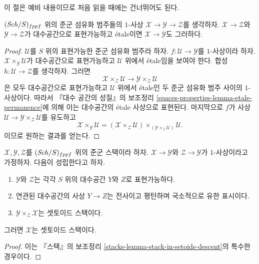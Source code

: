 \noindent
이 절은 예비 내용이므로 처음 읽을 때에는 건너뛰어도 된다.

\begin{lemma}
\label{lemma-etale-permanence}
$(\mathit{Sch}/S)_{fppf}$ 위의 준군 섬유화 범주들의 $1$-사상
$\mathcal{X} \to \mathcal{Y} \to \mathcal{Z}$를 생각하자.
$\mathcal{X} \to \mathcal{Z}$와 $\mathcal{Y} \to \mathcal{Z}$가
대수공간으로 표현가능하고 \'etale이면
$\mathcal{X} \to \mathcal{Y}$도 그러하다.
\end{lemma}

\begin{proof}
$\mathcal{U}$를 $S$ 위의 표현가능한 준군 섬유화 범주라 하자.
$f : \mathcal{U} \to \mathcal{Y}$를 $1$-사상이라 하자.
$\mathcal{X} \times_\mathcal{Y} \mathcal{U}$가 대수공간으로
표현가능하고 $\mathcal{U}$ 위에서 \'etale임을 보여야 한다.
합성 $h : \mathcal{U} \to \mathcal{Z}$를 생각하자. 그러면
$$
\mathcal{X} \times_\mathcal{Z} \mathcal{U}
\longrightarrow
\mathcal{Y} \times_\mathcal{Z} \mathcal{U}
$$
은 모두 대수공간으로 표현가능하고 $\mathcal{U}$ 위에서 \'etale인
두 준군 섬유화 범주 사이의 $1$-사상이다. 따라서
『대수 공간의 성질』의 보조정리
\ref{spaces-properties-lemma-etale-permanence}에 의해 이는
대수공간의 \'etale 사상으로 표현된다. 마지막으로 $f$가 사상
$\mathcal{U} \to \mathcal{Y} \times_\mathcal{Z} \mathcal{U}$를
유도하고
$$
\mathcal{X} \times_\mathcal{Y} \mathcal{U} =
(\mathcal{X} \times_\mathcal{Z} \mathcal{U})
\times_{(\mathcal{Y} \times_\mathcal{Z} \mathcal{U})}
\mathcal{U}.
$$
이므로 원하는 결과를 얻는다.
\end{proof}

\begin{lemma}
\label{lemma-stack-in-setoids-descent}
$\mathcal{X}, \mathcal{Y}, \mathcal{Z}$를 $(\mathit{Sch}/S)_{fppf}$ 위의
준군 스택이라 하자. $\mathcal{X} \to \mathcal{Y}$와
$\mathcal{Z} \to \mathcal{Y}$가 $1$-사상이라고 가정하자. 다음이 성립한다고 하자.
\begin{enumerate}
\item $\mathcal{Y}$와 $\mathcal{Z}$는 각각 $S$ 위의 대수공간
$Y$와 $Z$로 표현가능하다.
\item 연관된 대수공간의 사상 $Y \to Z$는 전사이고 평탄하며
국소적으로 유한 표시이다.
\item $\mathcal{Y} \times_\mathcal{Z} \mathcal{X}$는 셋토이드 스택이다.
\end{enumerate}
그러면 $\mathcal{X}$는 셋토이드 스택이다.
\end{lemma}

\begin{proof}
이는 『스택』의 보조정리
\ref{stacks-lemma-stack-in-setoids-descent}의 특수한 경우이다.
\end{proof}

